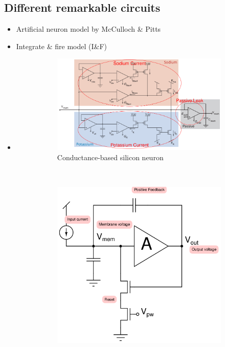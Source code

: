 \documentclass[english,11pt]{article}
\begin{document}
\subsection{Different remarkable circuits}
\begin{itemize}
\item Artificial neuron model by McCulloch \& Pitts
\item Integrate \& fire model (I\&F)
\item
\begin{figure}[H]
        \centering
        \begin{subfigure}[b]{0.5\textwidth}
                \centering
\includegraphics[width=\textwidth]{conductance-based-SI-neuron.png}
                \caption{Conductance-based silicon neuron}
        \end{subfigure}%
        ~
        \begin{subfigure}[b]{0.5\textwidth}
                \centering
				\includegraphics[width=\textwidth]{axon-hillock-circuit.png}

\end{subfigure}
\end{figure}
\end{itemize}
\end{document}
